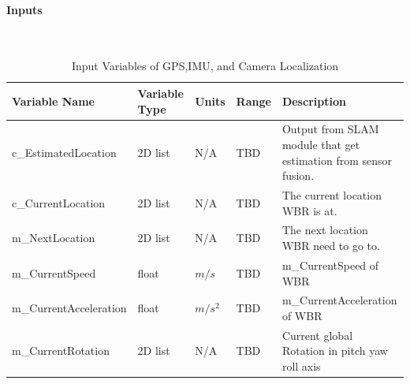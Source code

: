 \documentclass[12pt]{article}
\begin{document}
            \paragraph{Inputs}
                ~\newline
                \begin{table}[H]
                  \centering
                    \caption{Input Variables of GPS,IMU, and Camera Localization} \label{tbl:Input Variables of GPS,IMU, and Camera Localization}
                  \begin{tabularx}{\textwidth}{|p{5cm}|p{2cm}|p{1.2cm}|p{1cm}|X|}
                    \hline Variable Name & Variable Type & Units & Range & Description \\
                    \hline c\_EstimatedLocation & 2D list &  N/A & TBD & Output from SLAM module that get estimation from sensor fusion.\\
                    \hline c\_CurrentLocation & 2D list &  N/A & TBD & The current location WBR is at.\\
                    \hline m\_NextLocation & 2D list &  N/A & TBD & The next location WBR need to go to.\\
                    \hline m\_CurrentSpeed  & float & $m/s$ & TBD & m\_CurrentSpeed of WBR\\
                    \hline m\_CurrentAcceleration & float & $m/s^2$ & TBD & m\_CurrentAcceleration of WBR\\
                    \hline m\_CurrentRotation & 2D list & N/A & TBD & Current global Rotation in pitch yaw roll axis\\
                    \hline
                  \end{tabularx}
                \end{table} 
                
\end{document}
